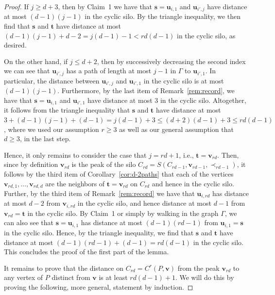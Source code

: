 \documentclass[centering,11pt,reqno]{amsart}
\theoremstyle{definition}
\begin{document}
\begin{proof}
If $j\ge d+3$, then by Claim~1 we have that $\mathbf{s}=\mathbf{u}_{i,1}$ and $\mathbf{u}_{i',j}$ have distance at most $(d-1)(j-1)$ in the cyclic silo. By the triangle inequality, we then find that $\mathbf{s}$ and $\mathbf{t}$ have distance at most $(d-1)(j-1)+d-2=j(d-1)-1< rd(d-1)$ in the cyclic silo, as desired. 

On the other hand, if $j\le d+2$, then by successively decreasing the second index we can see that $\mathbf{u}_{i',j}$ has a path of length at most $j-1$ in $\Gamma$ to $\mathbf{u}_{i',1}$. In particular, the distance between $\mathbf{u}_{i',j}$ and $\mathbf{u}_{i',1}$ in the cyclic silo is at most $(d-1)(j-1)$. Furthermore, by the last item of Remark~\ref{rem:record}, we have that $\mathbf{s}=\mathbf{u}_{i,1}$ and $\mathbf{u}_{i',1}$ have distance at most $3$ in the cyclic silo. Altogether, it follows from the triangle inequality that $\mathbf{s}$ and $\mathbf{t}$ have distance at most $3+(d-1)(j-1)+(d-1)=j(d-1)+3\le (d+2)(d-1)+3\le rd(d-1)$, where we used our assumption $r\ge 3$ as well as our general assumption that $d\ge 3$, in the last step. 

Hence, it only remains to consider the case that $j=rd+1$, i.e., $\mathbf{t}=\mathbf{v}_{rd}$. Then, since by definition $\mathbf{v}_{rd}$ is the peak of the silo $C_{rd}=S(C_{rd-1},\mathbf{v}_{rd-1},\prec_{rd-1})$, it follows by the third item of Corollary~\ref{cor:d-2paths} that each of the vertices $\mathbf{v}_{rd,1},\ldots,\mathbf{v}_{rd,d}$ are the neighbors of $\mathbf{t}=\mathbf{v}_{rd}$ on $C_{rd}$ and hence in the cyclic silo. Further, by the third item of Remark~\ref{rem:record} we have that $\mathbf{u}_{i,rd}$ has distance at most $d-2$ from $\mathbf{v}_{i,rd}$ in the cyclic silo, and hence distance at most $d-1$ from $\mathbf{v}_{rd}=\mathbf{t}$ in the cyclic silo. By Claim~1 or simply by walking in the graph $\Gamma$, we can also see that $\mathbf{s}=\mathbf{u}_{i,1}$ has distance at most $(d-1)(rd-1)$ from $\mathbf{u}_{i,1}=\mathbf{s}$ in the cyclic silo. Hence, by the triangle inequality, we find that $\mathbf{s}$ and $\mathbf{t}$ have distance at most $(d-1)(rd-1)+(d-1)=rd(d-1)$ in the cyclic silo. This concludes the proof of the first part of the lemma.  

It remains to prove that the distance on $C_{rd}=C^r(P,\mathbf{v})$ from the peak $\mathbf{v}_{rd}$ to any vertex of $P$ distinct from $\mathbf{v}$ is at least $rd(d-1)+1$. We will do this by proving the following, more general, statement by induction.


\end{proof}
\end{document}

